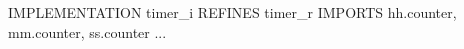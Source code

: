 \documentclass[10pt,a4paper]{article}
\begin{document}
\begin{pascalcode}
IMPLEMENTATION timer_i
REFINES timer_r
IMPORTS
    hh.counter, mm.counter, ss.counter
...
\end{pascalcode}
\end{document}
